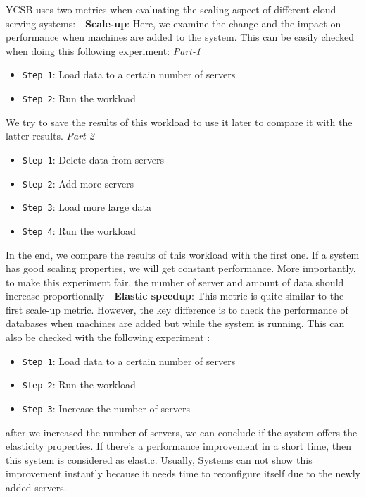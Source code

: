 \documentclass[sigconf,10pt]{acmart}
\begin{document}
YCSB uses two metrics when evaluating the scaling aspect of different cloud serving systems:\newline
\textA-   \textbf{Scale-up}:
Here, we examine the change and the impact on performance when machines are added to the system. This can be easily checked when doing this following experiment: \newline
\emph{Part-1}
\begin{itemize}
\item {\verb|Step 1|}: Load data to a certain number of servers
\item {\verb|Step 2|}: Run the workload
\end{itemize}
 We try to save the results of this workload to use it later to compare it with the latter results.  \newline
  \emph{Part 2}
 \begin{itemize}
\item {\verb|Step 1|}: Delete data from servers
\item {\verb|Step 2|}: Add more servers
\item {\verb|Step 3|}: Load more large data
\item {\verb|Step 4|}: Run the workload
\end{itemize}
 In the end, we compare the results of this workload with the first one. If a system has good scaling properties, we will get constant performance. More importantly, to make this experiment fair, the number of server and amount of data should increase proportionally \newline
 \textA-  \textbf{Elastic speedup}:
 This metric is quite similar to the first scale-up metric. However, the key difference is to check the performance of databases when machines are added but while the system is running. This can also be checked with the following experiment :
 \begin{itemize}
\item {\verb|Step 1|}: Load data to a certain number of servers
\item {\verb|Step 2|}: Run the workload
\item {\verb|Step 3|}: Increase the number of servers
\end{itemize}
after we increased the number of servers, we can conclude if the system offers the elasticity properties. If there's a performance improvement in a short time, then this system is considered as elastic. Usually, Systems can not show this improvement instantly because it needs time to reconfigure itself due to the newly added servers.
\end{document}

